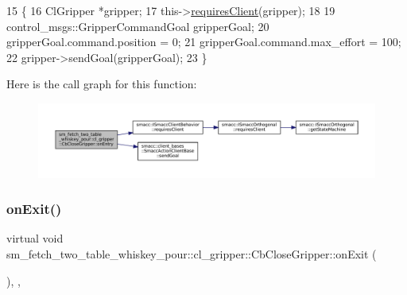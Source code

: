 \begin{DoxyCode}
15     \{
16         ClGripper *gripper;
17         this->\hyperlink{classsmacc_1_1ISmaccClientBehavior_a32b16e99e3b4cb289414203dc861a440}{requiresClient}(gripper);
18 
19         control\_msgs::GripperCommandGoal gripperGoal;
20         gripperGoal.command.position = 0;
21         gripperGoal.command.max\_effort = 100;
22         gripper->sendGoal(gripperGoal);
23     \}
\end{DoxyCode}
Here is the call graph for this function\+:
\nopagebreak
\begin{figure}[H]
\begin{center}
\leavevmode
\includegraphics[width=350pt]{classsm__fetch__two__table__whiskey__pour_1_1cl__gripper_1_1CbCloseGripper_acbc50aeab65aa2fa0374feaf34d8009f_cgraph}
\end{center}
\end{figure}
\mbox{\label{classsm__fetch__two__table__whiskey__pour_1_1cl__gripper_1_1CbCloseGripper_addead20a2d5c39561febe273843f189c}} 
\subsubsection{\texorpdfstring{on\+Exit()}{onExit()}}
{\footnotesize\ttfamily virtual void sm\+\_\+fetch\+\_\+two\+\_\+table\+\_\+whiskey\+\_\+pour\+::cl\+\_\+gripper\+::\+Cb\+Close\+Gripper\+::on\+Exit (\begin{DoxyParamCaption}{ }\end{DoxyParamCaption})\hspace{0.3cm}{\ttfamily [inline]}, {\ttfamily [override]}, {\ttfamily [virtual]}}




